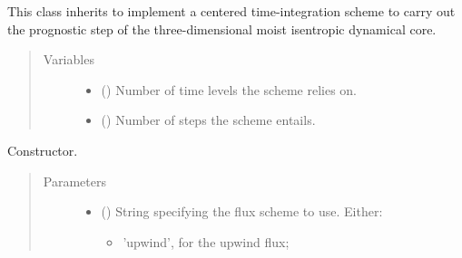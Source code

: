 \documentclass[letterpaper,10pt,english]{sphinxmanual}
\begin{document}
\begin{fulllineitems}
\label{\detokenize{api:tasmania.dycore.prognostic_isentropic_centered.PrognosticIsentropicCentered}}
This class inherits {\hyperref[\detokenize{api:tasmania.dycore.prognostic_isentropic.PrognosticIsentropic}]{}} to implement
a centered time-integration scheme to carry out the prognostic step of the three-dimensional
moist isentropic dynamical core.
\begin{quote}\begin{description}
\item[{Variables}] \leavevmode\begin{itemize}
\item {} 
{\hyperref[\detokenize{api:tasmania.dycore.dycore.DynamicalCore.time_levels}]{}} () \textendash{} Number of time levels the scheme relies on.

\item {} 
 () \textendash{} Number of steps the scheme entails.

\end{itemize}

\end{description}\end{quote}

\begin{fulllineitems}
\label{\detokenize{api:tasmania.dycore.prognostic_isentropic_centered.PrognosticIsentropicCentered.__init__}}
Constructor.
\begin{quote}\begin{description}
\item[{Parameters}] \leavevmode\begin{itemize}
\item {} 
 () \textendash{} 
String specifying the flux scheme to use. Either:
\begin{itemize}
\item {} 
’upwind’, for the upwind flux;


\end{itemize}
\end{itemize}
\end{description}
\end{quote}
\end{fulllineitems}
\end{fulllineitems}
\end{document}
